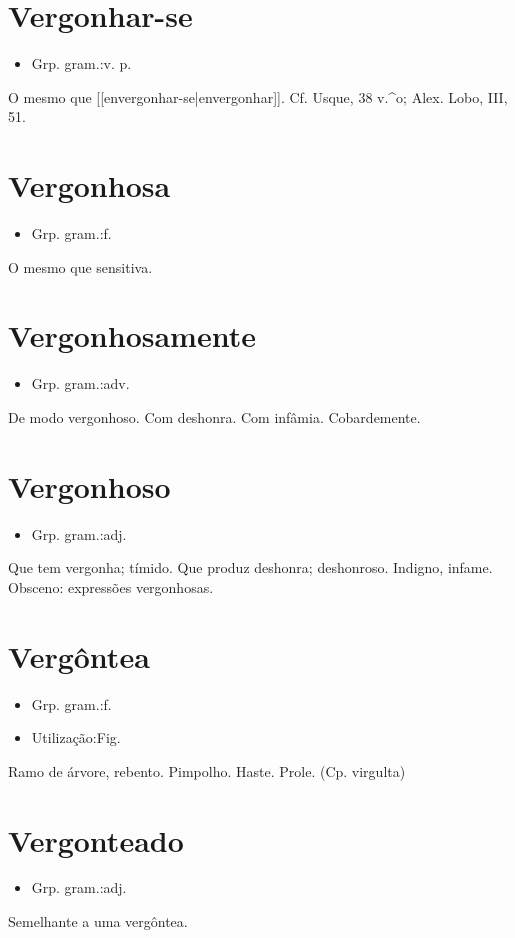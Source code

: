 \documentclass{article}
\begin{document}
\section{Vergonhar-se}
\begin{itemize}
\item {Grp. gram.:v. p.}
\end{itemize}
O mesmo que [[envergonhar-se|envergonhar]]. Cf. Usque, 38 v.^o; Alex. Lobo, III, 51.
\section{Vergonhosa}
\begin{itemize}
\item {Grp. gram.:f.}
\end{itemize}
O mesmo que \textunderscore sensitiva\textunderscore .
\section{Vergonhosamente}
\begin{itemize}
\item {Grp. gram.:adv.}
\end{itemize}
De modo vergonhoso.
Com deshonra.
Com infâmia.
Cobardemente.
\section{Vergonhoso}
\begin{itemize}
\item {Grp. gram.:adj.}
\end{itemize}
Que tem vergonha; tímido.
Que produz deshonra; deshonroso.
Indigno, infame.
Obsceno: \textunderscore expressões vergonhosas\textunderscore .
\section{Vergôntea}
\begin{itemize}
\item {Grp. gram.:f.}
\end{itemize}
\begin{itemize}
\item {Utilização:Fig.}
\end{itemize}
Ramo de árvore, rebento.
Pimpolho.
Haste.
Prole.
(Cp. \textunderscore virgulta\textunderscore )
\section{Vergonteado}
\begin{itemize}
\item {Grp. gram.:adj.}
\end{itemize}
Semelhante a uma vergôntea.
\end{document}
